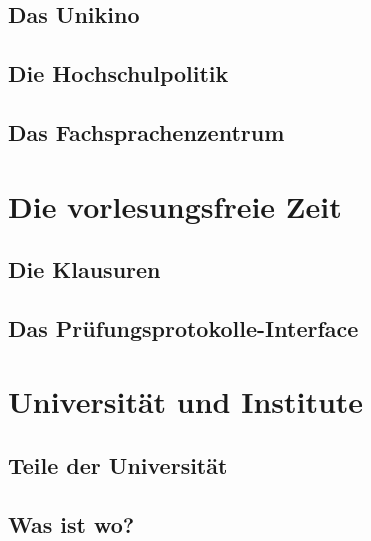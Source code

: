 \documentclass[12pt, a4paper]{article}
\newif\ifinfo
\begin{document}
\subsection{Das Unikino}


\subsection{Die Hochschulpolitik}



\subsection{Das Fachsprachenzentrum}


\pagebreak
\section{Die vorlesungsfreie Zeit}
\subsection{Die Klausuren}
\ifinfo
	
\else
	
\fi

\subsection{Das Prüfungsprotokolle-Interface}

\ifinfo
\else
	\vfill
\fi

\ifinfo
	\subsection{Praktika}
	
\fi

\pagebreak

\section{Universität und Institute}
\subsection{Teile der Universität}
\ifinfo
	
\else
	
\fi

\subsection{Was ist wo?}
\ifinfo
	
\else
	
\fi
\end{document}
